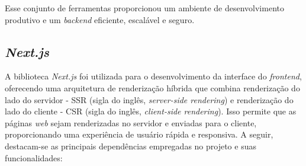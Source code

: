 Esse conjunto de ferramentas proporcionou um ambiente de desenvolvimento produtivo e um \textit{backend} eficiente, escalável e seguro.

\subsection{\textit{Next.js}}
A biblioteca \textit{Next.js} foi utilizada para o desenvolvimento da interface do \textit{frontend}, oferecendo uma arquitetura de renderização híbrida que combina renderização do lado do servidor - SSR (sigla do inglês, \textit{server-side rendering}) e renderização do lado do cliente - CSR (sigla do inglês, \textit{client-side rendering}). Isso permite que as páginas \textit{web} sejam renderizadas no servidor e enviadas para o cliente, proporcionando uma experiência de usuário rápida e responsiva. A seguir, destacam-se as principais dependências empregadas no projeto e suas funcionalidades:

